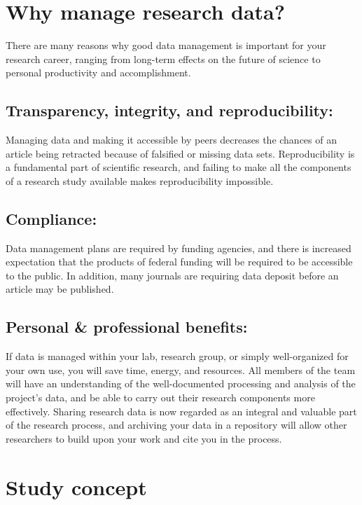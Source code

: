 \documentclass{tufte-handout}
\begin{document}
\section{Why manage research data?}\label{why-manage-research-data}

There are many reasons why good data management is important for your
research career, ranging from long-term effects on the future of science
to personal productivity and accomplishment.

\subsection{Transparency, integrity, and
reproducibility:}\label{transparency-integrity-and-reproducibility}

Managing data and making it accessible by peers decreases the chances of
an article being retracted because of falsified or missing data sets.
Reproducibility is a fundamental part of scientific research, and
failing to make all the components of a research study available makes
reproducibility impossible.

\subsection{Compliance:}\label{compliance}

Data management plans are required by funding agencies, and there is
increased expectation that the products of federal funding will be
required to be accessible to the public. In addition, many journals are
requiring data deposit before an article may be published.

\subsection{Personal \& professional
benefits:}\label{personal-professional-benefits}

If data is managed within your lab, research group, or simply
well-organized for your own use, you will save time, energy, and
resources. All members of the team will have an understanding of the
well-documented processing and analysis of the project's data, and be
able to carry out their research components more effectively. Sharing
research data is now regarded as an integral and valuable part of the
research process, and archiving your data in a repository will allow
other researchers to build upon your work and cite you in the process.

\section{Study concept}\label{study-concept}
\end{document}
